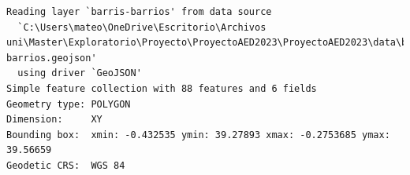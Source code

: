 \documentclass[notspecified,article,submit,moreauthors,pdftex]{Definitions/mdpi}
\newenvironment{Shaded}{\begin{snugshade}}{\end{snugshade}}
\newcommand{\CommentTok}[1]{\textcolor[rgb]{0.56,0.35,0.01}{\textit{#1}}}
\begin{document}
\begin{verbatim}
Reading layer `barris-barrios' from data source 
  `C:\Users\mateo\OneDrive\Escritorio\Archivos uni\Master\Exploratorio\Proyecto\ProyectoAED2023\ProyectoAED2023\data\barris-barrios.geojson' 
  using driver `GeoJSON'
Simple feature collection with 88 features and 6 fields
Geometry type: POLYGON
Dimension:     XY
Bounding box:  xmin: -0.432535 ymin: 39.27893 xmax: -0.2753685 ymax: 39.56659
Geodetic CRS:  WGS 84
\end{verbatim}

\begin{Shaded}
\end{Shaded}
\end{document}
